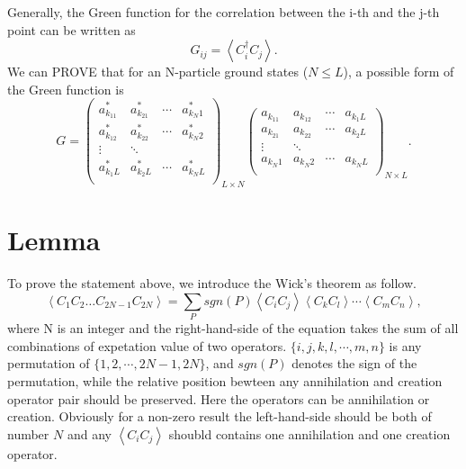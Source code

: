 \documentclass[prb,superscriptaddress,letter,10pt,onecolumn]{revtex4}
\begin{document}
Generally, the Green function for the correlation between the i-th and the j-th point can be written as
\begin{equation}
	G_{ij} = \left< C_i^\dagger C_j \right>.
\end{equation}
We can PROVE that for an N-particle ground states ($N\le L$), a possible form of the Green function is
\begin{equation}
	G = 
	\left(                 	
	\begin{array}{cccc}   		
		a_{k_11}^* & a_{k_21}^* & \cdots & a_{k_N1}^*\\  		
		a_{k_12}^* & a_{k_22}^* & \cdots & a_{k_N2}^*\\
		\vdots & \ddots &  & \\
		a_{k_1L}^* & a_{k_2L}^* & \cdots & a_{k_NL}^*\\  		
	\end{array}	
	\right)_{L\times N}
	\left( 
	\begin{array}{cccc}   		
		a_{k_11} & a_{k_12} & \cdots & a_{k_1L}\\  		
		a_{k_21} & a_{k_22} & \cdots & a_{k_2L}\\
		\vdots & \ddots &  & \\
		a_{k_N1} & a_{k_N2} & \cdots & a_{k_NL}\\  		
	\end{array}	
	\right)_{N\times L}.
\end{equation}

\section{Lemma}

To prove the statement above, we introduce the Wick's theorem as follow.
\begin{equation}
	\left< C_1C_2\dots C_{2N-1}C_{2N} \right> = \sum_{P} sgn(P)\left< C_iC_j\right>\left< C_kC_l\right>\cdots\left< C_mC_n\right>,
\end{equation}
where N is an integer and the right-hand-side of the equation takes the sum of all combinations of expetation value of two operators. $\{i,j,k,l,\cdots,m,n\}$ is any permutation of $\{1,2,\cdots,2N-1,2N\}$, and $sgn(P)$ denotes the sign of the permutation, while the relative position bewteen any annihilation and creation operator pair should be preserved.
Here the operators can be annihilation or creation.
Obviously for a non-zero result the left-hand-side should be both of number $N$ and any $\left< C_iC_j\right>$ shoubld contains one annihilation and one creation operator.
\end{document}
